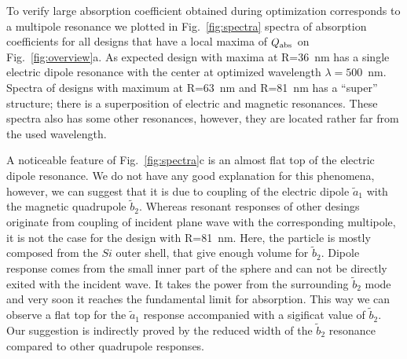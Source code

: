 \documentclass[aps,prl,twocolumn,showpacs,superscriptaddress,groupedaddress]{revtex4-1}
\begin{document}
\begin{figure}
\end{figure}
To verify large absorption coefficient obtained during optimization
corresponds to a multipole resonance we plotted in
Fig.~\ref{fig:spectra} spectra of absorption coefficients for all
designs that have a local maxima of $Q_{\rm abs}$ on
Fig.~\ref{fig:overview}a.  As expected design with maxima at R=36~nm
has a single electric dipole resonance with the center at optimized
wavelength $\lambda=500$~nm.  Spectra of designs with maximum at
R=63~nm and R=81~nm has a ``super'' structure; there is a
superposition of electric and magnetic resonances.  These spectra also
has some other resonances, however, they are located rather far from
the used wavelength.  

A noticeable feature of Fig.~\ref{fig:spectra}c is an almost flat top
of the electric dipole resonance.  We do not have any good explanation
for this phenomena, however, we can suggest that it is due to coupling
of the electric dipole $\tilde{a}_1$ with the magnetic quadrupole
$\tilde{b}_2$.  Whereas resonant responses of other desings originate
from coupling of incident plane wave with the corresponding multipole, it
is not the case for the design with R=81~nm. Here, the particle is
mostly composed from the $Si$ outer shell, that give enough volume for
$\tilde{b}_2$.  Dipole response comes from the small inner part of the
sphere and can not be directly exited with the incident wave.  It
takes the power from the surrounding $\tilde{b}_2$ mode and very soon
it reaches the fundamental limit for absorption.  This way we can
observe a flat top for the $\tilde{a}_1$ response accompanied with a
sigificat value of $\tilde{b}_2$.  Our suggestion is indirectly proved
by the reduced width of the $\tilde{b}_2$ resonance compared to
other quadrupole responses.
\end{document}
